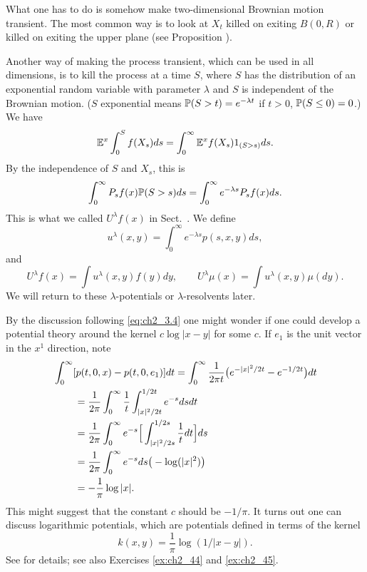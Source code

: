 What one has to do is somehow make two-dimensional Brownian motion transient. The most common way is to look at $X_t$ killed on exiting $B(0,R)$ or killed on exiting the upper plane (see Proposition ).

Another way of making the process transient, which can be used in all dimensions, is to kill the process at a time $S$, where $S$ has the distribution of an exponential random variable with parameter $\lambda$ and $S$ is independent of the Brownian motion. ($S$ exponential means $\P(S > t) = e^{-\lambda t}$ if $t > 0$, $\P(S \leq 0) = 0$.) We have
\[
    \E^x\int_0^S f(X_s)ds = \int_0^\infty \E^xf(X_s)1_{(S>s)}ds.
\]
By the independence of $S$ and $X_s$, this is
\[
    \int_0^\infty P_sf(x)\P(S > s)ds = \int_0^\infty e^{-\lambda s}P_sf(x)ds.
\]
This is what we called $U^\lambda f(x)$ in Sect.\ . We define
\begin{equation}\label{eq:ch2_3.21}
    u^\lambda(x,y) = \int_0^\infty e^{-\lambda s}p(s,x,y)ds,
\end{equation}
and
\begin{equation}\label{eq:ch2_3.22}
    U^\lambda f(x) = \int u^\lambda(x,y)f(y)dy, \qquad U^\lambda\mu(x) = \int u^\lambda(x,y)\mu(dy).
\end{equation}
We will return to these $\lambda$-potentials or $\lambda$-resolvents later.

By the discussion following \eqref{eq:ch2_3.4} one might wonder if one could develop a potential theory around the kernel $c\log|x-y|$ for some $c$. If $e_1$ is the unit vector in the $x^1$ direction, note
\begin{align}\label{eq:ch2_3.23}
    &\int_0^\infty[p(t,0,x) - p(t,0,e_1)]dt = \int_0^\infty \frac{1}{2\pi t}\big(e^{-|x|^2/2t} - e^{-1/2t}\big)dt \\
    &\qquad\,= \frac{1}{2\pi}\int_0^\infty\frac{1}{t}\int_{|x|^2/2t}^{1/2t} e^{-s}ds dt \notag \\
    &\qquad\,= \frac{1}{2\pi}\int_0^\infty e^{-s}\Big[\int_{|x|^2/2s}^{1/2s} \frac{1}{t}dt\Big]ds \notag \\
    &\qquad\,= \frac{1}{2\pi}\int_0^\infty e^{-s}ds\big(-\log(|x|^2)\big) \notag \\
    &\qquad\,= -\frac{1}{\pi}\log|x|. \notag
\end{align}
This might suggest that the constant $c$ should be $-1/\pi$. It turns out one can discuss logarithmic potentials, which are potentials defined in terms of the kernel
\begin{equation}\label{eq:ch2_3.24}
    k(x,y) = \frac{1}{\pi}\log(1/|x-y|).
\end{equation}
See \cite{PortStone1978} for details; see also Exercises \ref{ex:ch2_44} and \ref{ex:ch2_45}.

